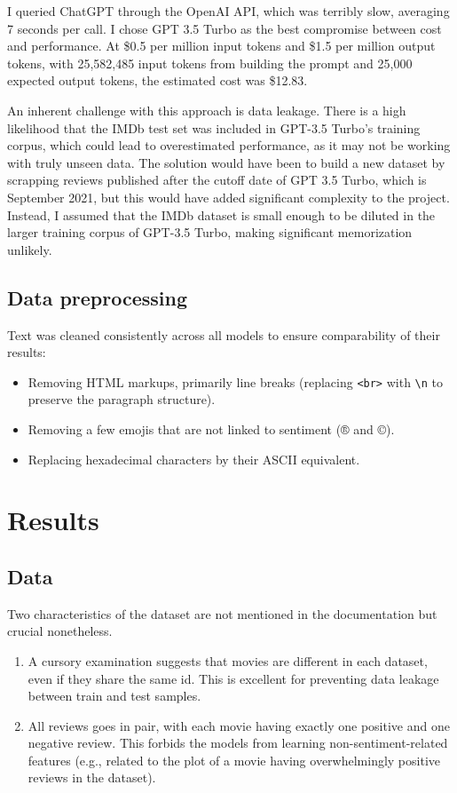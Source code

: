 \documentclass{article}
\begin{document}
I queried ChatGPT through the OpenAI API, which was terribly slow, averaging 7 seconds per call. I chose GPT 3.5 Turbo as the best compromise between cost and performance. At \$0.5 per million input tokens and \$1.5 per million output tokens, with 25,582,485 input tokens from building the prompt and 25,000 expected output tokens, the estimated cost was \$12.83.

An inherent challenge with this approach is data leakage. There is a high likelihood that the IMDb test set was included in GPT-3.5 Turbo's training corpus, which could lead to overestimated performance, as it may not be working with truly unseen data. The solution would have been to build a new dataset by scrapping reviews published after the cutoff date of GPT 3.5 Turbo, which is September 2021, but this would have added significant complexity to the project. Instead, I assumed that the IMDb dataset is small enough to be diluted in the larger training corpus of GPT-3.5 Turbo, making significant memorization unlikely.

\subsection{Data preprocessing}

Text was cleaned consistently across all models to ensure comparability of their results:
\begin{itemize}
    \item Removing HTML markups, primarily line breaks (replacing \texttt{<br>} with \texttt{\textbackslash n} to preserve the paragraph structure).
	\item Removing a few emojis that are not linked to sentiment (® and ©).
    \item Replacing hexadecimal characters by their ASCII equivalent.
\end{itemize}

\section{Results}

\subsection{Data}

Two characteristics of the dataset are not mentioned in the documentation but crucial nonetheless.
\begin{enumerate}
    \item A cursory examination suggests that movies are different in each dataset, even if they share the same id. This is excellent for preventing data leakage between train and test samples.
	\item All reviews goes in pair, with each movie having exactly one positive and one negative review. This forbids the models from learning non-sentiment-related features (e.g., related to the plot of a movie having overwhelmingly positive reviews in the dataset).
\end{enumerate}
\end{document}
